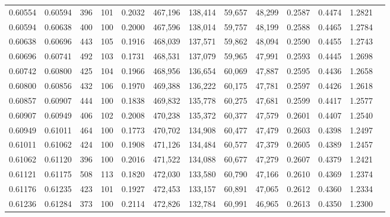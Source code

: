 \begin{tabular}{rrrrrrrrrrrrr}
0.60554 & 0.60594 &   396 & 101 &                                     0.2032 & 467,196 & 138,414 &  59,657 &  48,299 & 0.2587 & 0.4474 & 1.2821 \\
0.60594 & 0.60638 &   400 & 100 &                                     0.2000 & 467,596 & 138,014 &  59,757 &  48,199 & 0.2588 & 0.4465 & 1.2784 \\
0.60638 & 0.60696 &   443 & 105 &                                     0.1916 & 468,039 & 137,571 &  59,862 &  48,094 & 0.2590 & 0.4455 & 1.2743 \\
0.60696 & 0.60741 &   492 & 103 &                                     0.1731 & 468,531 & 137,079 &  59,965 &  47,991 & 0.2593 & 0.4445 & 1.2698 \\
0.60742 & 0.60800 &   425 & 104 &                                     0.1966 & 468,956 & 136,654 &  60,069 &  47,887 & 0.2595 & 0.4436 & 1.2658 \\
0.60800 & 0.60856 &   432 & 106 &                                     0.1970 & 469,388 & 136,222 &  60,175 &  47,781 & 0.2597 & 0.4426 & 1.2618 \\
0.60857 & 0.60907 &   444 & 100 &                                     0.1838 & 469,832 & 135,778 &  60,275 &  47,681 & 0.2599 & 0.4417 & 1.2577 \\
0.60907 & 0.60949 &   406 & 102 &                                     0.2008 & 470,238 & 135,372 &  60,377 &  47,579 & 0.2601 & 0.4407 & 1.2540 \\
0.60949 & 0.61011 &   464 & 100 &                                     0.1773 & 470,702 & 134,908 &  60,477 &  47,479 & 0.2603 & 0.4398 & 1.2497 \\
0.61011 & 0.61062 &   424 & 100 &                                     0.1908 & 471,126 & 134,484 &  60,577 &  47,379 & 0.2605 & 0.4389 & 1.2457 \\
0.61062 & 0.61120 &   396 & 100 &                                     0.2016 & 471,522 & 134,088 &  60,677 &  47,279 & 0.2607 & 0.4379 & 1.2421 \\
0.61121 & 0.61175 &   508 & 113 &                                     0.1820 & 472,030 & 133,580 &  60,790 &  47,166 & 0.2610 & 0.4369 & 1.2374 \\
0.61176 & 0.61235 &   423 & 101 &                                     0.1927 & 472,453 & 133,157 &  60,891 &  47,065 & 0.2612 & 0.4360 & 1.2334 \\
0.61236 & 0.61284 &   373 & 100 &                                     0.2114 & 472,826 & 132,784 &  60,991 &  46,965 & 0.2613 & 0.4350 & 1.2300 \\

\end{tabular}

